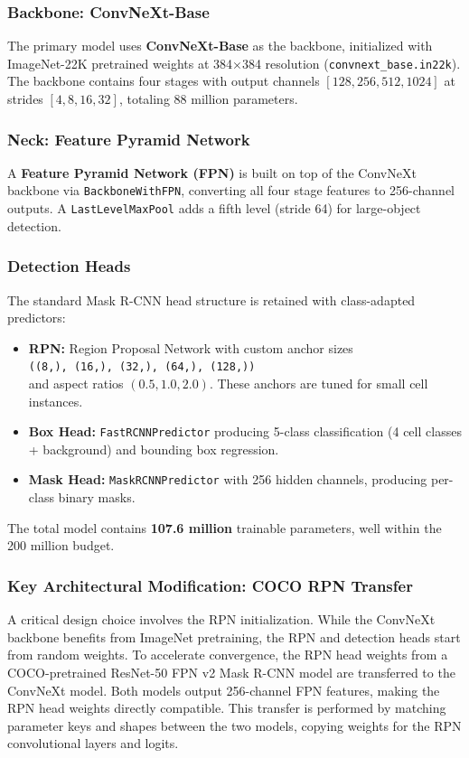 \documentclass[12pt, a4paper]{article}
\begin{document}
\subsubsection{Backbone: ConvNeXt-Base}
The primary model uses \textbf{ConvNeXt-Base} as the backbone, initialized with ImageNet-22K pretrained weights at 384$\times$384 resolution (\texttt{convnext\_base.in22k}). The backbone contains four stages with output channels $[128, 256, 512, 1024]$ at strides $[4, 8, 16, 32]$, totaling 88 million parameters.

\subsubsection{Neck: Feature Pyramid Network}
A \textbf{Feature Pyramid Network (FPN)} \cite{lin2017} is built on top of the ConvNeXt backbone via \texttt{BackboneWithFPN}, converting all four stage features to 256-channel outputs. A \texttt{LastLevelMaxPool} adds a fifth level (stride 64) for large-object detection.

\subsubsection{Detection Heads}
The standard Mask R-CNN head structure is retained with class-adapted predictors:

\begin{itemize}
    \item \textbf{RPN:} Region Proposal Network with custom anchor sizes\\[-3pt]
    \hspace*{1.5em}\texttt{((8,), (16,), (32,), (64,), (128,))}\\[-3pt]
    \hspace*{1.5em}and aspect ratios $(0.5, 1.0, 2.0)$. These anchors are tuned for small cell instances.
    \item \textbf{Box Head:} \texttt{FastRCNNPredictor} producing 5-class classification (4 cell classes + background) and bounding box regression.
    \item \textbf{Mask Head:} \texttt{MaskRCNNPredictor} with 256 hidden channels, producing per-class binary masks.
\end{itemize}

The total model contains \textbf{107.6 million} trainable parameters, well within the 200 million budget.

\subsubsection{Key Architectural Modification: COCO RPN Transfer}
A critical design choice involves the RPN initialization. While the ConvNeXt backbone benefits from ImageNet pretraining, the RPN and detection heads start from random weights. To accelerate convergence, the RPN head weights from a COCO-pretrained ResNet-50 FPN v2 Mask R-CNN model are transferred to the ConvNeXt model. Both models output 256-channel FPN features, making the RPN head weights directly compatible. This transfer is performed by matching parameter keys and shapes between the two models, copying weights for the RPN convolutional layers and logits.
\end{document}

